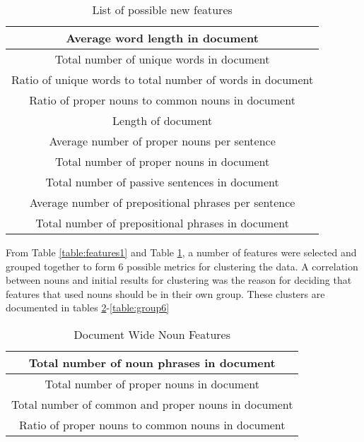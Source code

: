 \documentclass[]{article}
\begin{document}
\begin{table}[!htbp]
	\begin{center}
		\begin{tabular}{| c |} \hline
			Average word length in document \\ \hline
			Total number of unique words in document\\ \hline
			Ratio of unique words to total number of words in document \\ \hline
			Ratio of proper nouns to common nouns in document \\ \hline
			Length of document \\ \hline
			Average number of proper nouns per sentence \\ \hline
			Total number of proper nouns in document \\ \hline
			Total number of passive sentences in document \\ \hline
			Average number of prepositional phrases per sentence \\ \hline
			Total number of prepositional phrases in document \\ \hline
		\end{tabular}
	\end{center}
	\caption{List of possible new features}
	\label{table:features2}
\end{table}

From Table \ref{table:features1} and Table \ref{table:features2}, a number of features were selected and grouped together to form 6 possible metrics for clustering the data.
A correlation between nouns and initial results for clustering was the reason for deciding that features that used nouns should be in their own group.
These clusters are documented in tables \ref{table:group1}-\ref{table:group6}

\begin{table}[!htbp]
	\begin{center}
		\begin{tabular}{| c |} \hline
			Total number of noun phrases in document \\ \hline
      Total number of proper nouns in document \\ \hline
			Total number of common and proper nouns in document \\ \hline
			Ratio of proper nouns to common nouns in document \\ \hline
		\end{tabular}
	\end{center}
	\caption{Document Wide Noun Features}
	\label{table:group1}
\end{table}
\end{document}
